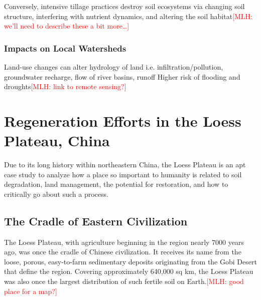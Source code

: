 \documentclass{book}\usepackage{knitr}
\newcommand{\red}[1]{\textcolor{red}{[MLH: #1]}}
\begin{document}
Conversely, intensive tillage practices destroy soil ecosystems via changing soil structure, interfering with nutrient dynamics, and altering the soil habitat\red{we'll need to describe these a bit more\ldots}

\subsubsection{Impacts on Local Watersheds}
Land-use changes can alter hydrology of land i.e. infiltration/pollution, groundwater recharge, flow of river basins, runoff
Higher risk of flooding and droughts\red{link to remote sensing?}

\section{Regeneration Efforts in the Loess Plateau, China}

Due to its long history within northeastern China, the Loess Plateau is an apt case study to analyze how a place so important to humanity is related to soil degradation, land management, the potential for restoration, and how to critically go about such a process.

\subsection{The Cradle of Eastern Civilization}

The Loess Plateau, with agriculture beginning in the region nearly 7000 years ago, was once the cradle of Chinese civilization. It receives its name from the loose, porous, easy-to-farm sedimentary deposits originating from the Gobi Desert that define the region. Covering approximately 640,000 sq km, the Loess Plateau was also once the largest distribution of such fertile soil on Earth.\red{good place for a map?}
\end{document}
